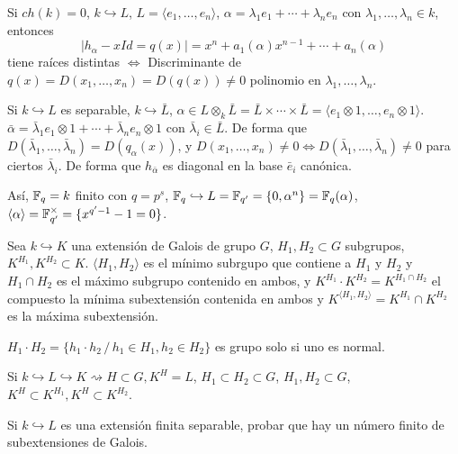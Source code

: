 \begin{dem}
     Si $ch(k)=0$, $k \hookrightarrow L$, $L = \langle e_1, \ldots, e_n\rangle$, $\alpha = \lambda_1 e_1 + \cdots + \lambda_n e_n$ con $\lambda_1, \ldots, \lambda_n \in k$, entonces
    $$|h_{\alpha} - xId =q(x)| = x^n + a_1(\alpha) x^{n-1} + \cdots + a_n(\alpha)$$
    tiene ra\'ices distintas $\iff$ Discriminante de $q(x) = D(x_1, \ldots, x_n) = D(q(x)) \neq 0$ polinomio en $\lambda_1, \ldots, \lambda_n$.  

    Si $k \hookrightarrow L$ es separable, $k \hookrightarrow \bar L$, $\alpha \in  L \otimes_k \bar L =\bar L \times \cdots \times \bar L = \langle e_1\otimes 1, \ldots, e_n\otimes 1\rangle$. $\bar \alpha = \bar \lambda_1 e_1\otimes 1 + \cdots + \bar \lambda_n e_n \otimes 1$ con $\bar \lambda_i \in \bar L$. De forma que $D(\bar \lambda_1, \ldots, \bar \lambda_n) = D(q_{\alpha}(x))$, y $D(x_1, \ldots, x_n) \neq 0 \iff D(\bar \lambda_1, \ldots, \bar \lambda_n) \neq 0$ para ciertos $\bar \lambda_i$. De forma que $h_{\bar \alpha}$ es diagonal en la base $\bar e_i$ can\'onica. 

    As\'i, $\mathbb{F}_q = k$ finito con $q=p^s$, $\mathbb{F}_q \hookrightarrow L = \mathbb{F}_{q'} = \{0, \alpha^n\} = \mathbb{F}_q(\alpha)$, $\langle \alpha \rangle = \mathbb{F}_{q'}^{\times} = \{x^{q'-1}-1=0\}$. 
\end{dem}
\begin{prop}
    Sea $k \hookrightarrow K$ una extensi\'on de Galois de grupo $G$, $H_1, H_2\subset G$ subgrupos, $K^{H_1}, K^{H_2} \subset K$. $\langle H_1, H_2\rangle$ es el m\'inimo subrgupo que contiene a $H_1$ y $H_2$ y $H_1 \cap H_2$ es el m\'aximo subgrupo contenido en ambos, y $K^{H_1} \cdot K^{H_2} = K^{H_1 \cap H_2}$ el compuesto la m\'inima subextensi\'on contenida en ambos y $K^{\langle H_1, H_2\rangle} = K^{H_1}\cap K^{H_2}$ es la m\'axima subextensi\'on.
    
    $H_1\cdot H_2 = \{ h_1\cdot h_2 \, / \, h_1\in H_1, h_2 \in H_2\}$ es grupo solo si uno es normal. 

    Si $k \hookrightarrow L \hookrightarrow K \rightsquigarrow H \subset G, K^H=L$, $H_1\subset H_2\subset G$, $H_1, H_2\subset G$, $K^H \subset K^{H_1}, K^H \subset K^{H_2}$. 
\end{prop}
\begin{prop}
    Si $k \hookrightarrow L$ es una extensi\'on finita separable, probar que hay un n\'umero finito de subextensiones de Galois. 
\end{prop}